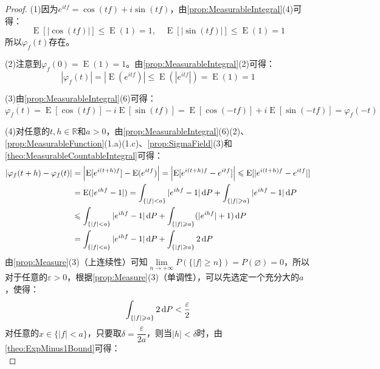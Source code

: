 \begin{proof}
	(1)因为$e^{itf}=\cos(tf)+i\sin(tf)$，由\cref{prop:MeasurableIntegral}(4)可得：
	\begin{equation*}
		\operatorname{E}[|\cos(tf)|]\leqslant\operatorname{E}(1)=1,\quad\operatorname{E}[|\sin(tf)|]\leqslant\operatorname{E}(1)=1
	\end{equation*}
	所以$\varphi_f(t)$存在。\par
	(2)注意到$\varphi_f(0)=\operatorname{E}(1)=1$。由\cref{prop:MeasurableIntegral}(2)可得：
	\begin{equation*}
		|\varphi_f(t)|=|\operatorname{E}(e^{itf})|\leqslant\operatorname{E}(|e^{itf}|)=\operatorname{E}(1)=1
	\end{equation*}\par
	(3)由\cref{prop:MeasurableIntegral}(6)可得：
	\begin{equation*}
		\overline{\varphi_f(t)}=\operatorname{E}[\cos(tf)]-i\operatorname{E}[\sin(tf)]=\operatorname{E}[\cos(-tf)]+i\operatorname{E}[\sin(-tf)]=\varphi_f(-t)
	\end{equation*}\par
	(4)对任意的$t,h\in \mathbb{R}$和$a>0$，由\cref{prop:MeasurableIntegral}(6)(2)、\cref{prop:MeasurableFunction}(1.a)(1.c)、\cref{prop:SigmaField}(3)和\cref{theo:MeasurableCountableIntegral}可得：
	\begin{align*}
		|\varphi_f(t+h)-\varphi_f(t)|
		&=\left|\operatorname{E}[e^{i(t+h)f}]-\operatorname{E}(e^{itf})\right|=\left|\operatorname{E}[e^{i(t+h)f}-e^{itf}]\right|\leqslant\operatorname{E}[|e^{i(t+h)f}-e^{itf}|] \\
		&=\operatorname{E}(|e^{ihf}-1|)=\int_{\{|f|<a\}}|e^{ihf}-1|\mathop{}\!\mathrm{d} P+\int_{\{|f|\geqslant a\}}|e^{ihf}-1|\mathop{}\!\mathrm{d} P \\
		&\leqslant\int_{\{|f|<a\}}|e^{ihf}-1|\mathop{}\!\mathrm{d} P+\int_{\{|f|\geqslant a\}}(|e^{ihf}|+1)\mathop{}\!\mathrm{d} P \\
		&=\int_{\{|f|<a\}}|e^{ihf}-1|\mathop{}\!\mathrm{d} P+\int_{\{|f|\geqslant a\}}2\mathop{}\!\mathrm{d} P
	\end{align*}
	由\cref{prop:Measure}(3)（上连续性）可知$\lim\limits_{n\to+\infty}P(\{|f|\geqslant n\})=P(\varnothing)=0$，所以对于任意的$\varepsilon>0$，根据\cref{prop:Measure}(3)（单调性），可以先选定一个充分大的$a$，使得：
	\begin{equation*}
		\int_{\{|f|\geqslant a\}}2\mathop{}\!\mathrm{d} P<\frac{\varepsilon}{2}
	\end{equation*}
	对任意的$x\in\{|f|<a\}$，只要取$\delta=\dfrac{\varepsilon}{2a}$，则当$|h|<\delta$时，由\cref{theo:ExpMinus1Bound}可得：
	\begin{equation*}

\end{equation*}
\end{proof}
